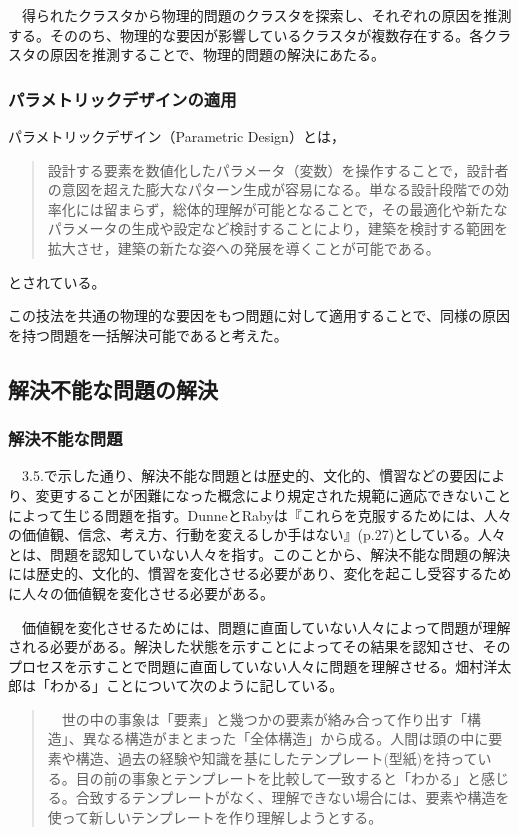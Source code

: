\documentclass{jsarticle}
\begin{document}
　得られたクラスタから物理的問題のクラスタを探索し、それぞれの原因を推測する。そののち、物理的な要因が影響しているクラスタが複数存在する。各クラスタの原因を推測することで、物理的問題の解決にあたる。

\subsubsection{パラメトリックデザインの適用}
パラメトリックデザイン（Parametric Design）\cite{Parametric}とは，
\begin{quotation}
設計する要素を数値化したパラメータ（変数）を操作することで，設計者の意図を超えた膨大なパターン生成が容易になる。単なる設計段階での効率化には留まらず，総体的理解が可能となることで，その最適化や新たなパラメータの生成や設定など検討することにより，建築を検討する範囲を拡大させ，建築の新たな姿への発展を導くことが可能である。
\end{quotation}

とされている。

この技法を共通の物理的な要因をもつ問題に対して適用することで、同様の原因を持つ問題を一括解決可能であると考えた。
\newpage
\subsection{解決不能な問題の解決}

\subsubsection{解決不能な問題}
　3.5.で示した通り、解決不能な問題とは歴史的、文化的、慣習などの要因により、変更することが困難になった概念により規定された規範に適応できないことによって生じる問題を指す。DunneとRabyは『これらを克服するためには、人々の価値観、信念、考え方、行動を変えるしか手はない』(p.27)としている。人々とは、問題を認知していない人々を指す。このことから、解決不能な問題の解決には歴史的、文化的、慣習を変化させる必要があり、変化を起こし受容するために人々の価値観を変化させる必要がある。

　価値観を変化させるためには、問題に直面していない人々によって問題が理解される必要がある。解決した状態を示すことによってその結果を認知させ、そのプロセスを示すことで問題に直面していない人々に問題を理解させる。畑村洋太郎は「わかる」ことについて次のように記している。

\begin{quotation}
　世の中の事象は「要素」と幾つかの要素が絡み合って作り出す「構造」、異なる構造がまとまった「全体構造」から成る。人間は頭の中に要素や構造、過去の経験や知識を基にしたテンプレート(型紙)を持っている。目の前の事象とテンプレートを比較して一致すると「わかる」と感じる。合致するテンプレートがなく、理解できない場合には、要素や構造を使って新しいテンプレートを作り理解しようとする。
\end{quotation}
\end{document}
